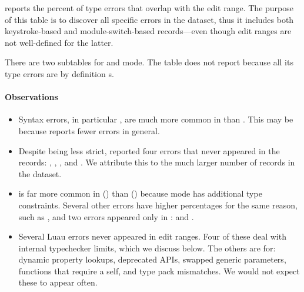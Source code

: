 \documentclass[english,submission,cleveref]{programming}
\begin{document}

 reports the percent of type errors that overlap with
the edit range.
The purpose of this table is to discover all specific errors in the dataset,
thus it includes both keystroke-based and module-switch-based records---even
though edit ranges are not well-defined for the latter.

There are two subtables for \mnonstrict{} and \mstrict{} mode.
The table does not report \mnocheck{} because all its type errors are
by definition s.


\paragraph{Observations}

\begin{itemize}
  \item
    Syntax errors, in particular , are much more
    common in \mnonstrict{} than \mstrict{}.
    This may be because \mnonstrict{} reports fewer errors in general.

  \item
    Despite being less strict, \mnonstrict{} reported four errors that
    never appeared in the \mstrict{} records:
    , ,
    , and .
    We attribute this to the much larger number of \mnonstrict{} records in the
    dataset.

  \item
     is far more common in \mstrict{} ()
    than \mnonstrict{} () because \mstrict{} mode
    has additional type constraints.
    Several other errors have higher \mstrict{} percentages for the
    same reason, such as , and
    two errors appeared only in \mstrict{}:
     and .

  \item
    Several Luau errors never appeared in edit ranges.
    Four of these deal with internal typechecker limits, which we discuss
    below.
    The others are for: dynamic property lookups,
    deprecated APIs, swapped generic parameters,
    functions that require a self, and type pack mismatches.
    We would not expect these to appear often.


\end{itemize}
\end{document}
